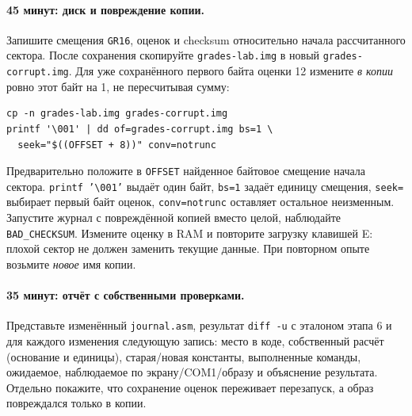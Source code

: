 \paragraph{45 минут: диск и повреждение копии.}
Запишите смещения \texttt{GR16}, оценок и checksum относительно
начала рассчитанного сектора. После сохранения скопируйте
\texttt{grades-lab.img} в новый \texttt{grades-corrupt.img}.
Для уже сохранённого первого байта оценки 12 измените \emph{в копии}
ровно этот байт на 1, не пересчитывая сумму:
\begin{lstlisting}[basicstyle=\ttfamily\footnotesize]
cp -n grades-lab.img grades-corrupt.img
printf '\001' | dd of=grades-corrupt.img bs=1 \
  seek="$((OFFSET + 8))" conv=notrunc
\end{lstlisting}
Предварительно положите в \texttt{OFFSET} найденное байтовое
смещение начала сектора. \texttt{printf '\textbackslash001'} выдаёт
один байт, \texttt{bs=1} задаёт единицу смещения,
\texttt{seek=} выбирает первый байт оценок, \texttt{conv=notrunc}
оставляет остальное неизменным. Запустите журнал с повреждённой
копией вместо целой, наблюдайте \texttt{BAD\_CHECKSUM}.
Измените оценку в RAM и повторите загрузку клавишей E:
плохой сектор не должен заменить текущие данные. При повторном опыте
возьмите \emph{новое} имя копии.

\paragraph{35 минут: отчёт с собственными проверками.}
Представьте изменённый \texttt{journal.asm}, результат
\texttt{diff -u} с эталоном этапа 6 и для каждого изменения
следующую запись: место в коде, собственный расчёт (основание и
единицы), старая/новая константы, выполненные команды, ожидаемое,
наблюдаемое по экрану/COM1/образу и объяснение результата.
Отдельно покажите, что сохранение оценок переживает перезапуск,
а образ повреждался только в копии.
\endgroup
